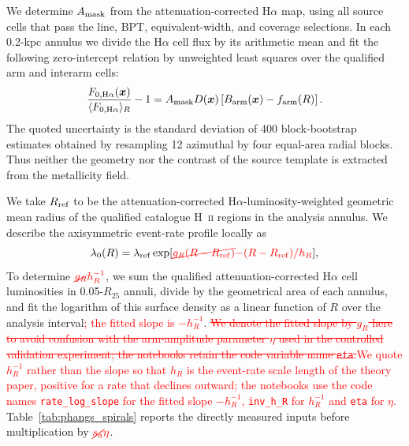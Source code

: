 \documentclass[fleqn,usenatbib]{mnras}
\newcommand{\bs}[1]{\boldsymbol{#1}}
\newcommand{\revadd}[1]{\textcolor{red}{#1}}
\newcommand{\revdel}[1]{\textcolor{red}{\sout{#1}}\hspace{0.18em}}
\newcommand{\revaddmath}[1]{\textcolor{red}{#1}}
\newcommand{\revdelmath}[1]{\textcolor{red}{\cancel{#1}}}
\begin{document}
We determine $A_{\rm mask}$ from the attenuation-corrected H$\alpha$ map, using all source cells that pass the line, BPT, equivalent-width, and coverage selections.  In each 0.2-kpc annulus we divide the H$\alpha$ cell flux by its arithmetic mean and fit the following zero-intercept relation by unweighted least squares over the qualified arm and interarm cells:
\begin{equation}
    \frac{F_{0,{\rm H}\alpha}(\bs{x})}
    {\langle F_{0,{\rm H}\alpha}\rangle_R}-1
    =A_{\rm mask}D(\bs{x})
    \left[B_{\rm arm}(\bs{x})-f_{\rm arm}(R)\right].
    \label{eq:phangs_mask_contrast}
\end{equation}
The quoted uncertainty is the standard deviation of 400 block-bootstrap estimates obtained by resampling 12 azimuthal by four equal-area radial blocks.  Thus neither the geometry nor the contrast of the source template is extracted from the metallicity field.

We take $R_{\rm ref}$ to be the attenuation-corrected H$\alpha$-luminosity-weighted geometric mean radius of the qualified catalogue H~\textsc{ii} regions in the analysis annulus.  We describe the axisymmetric event-rate profile locally as
\begin{equation}
    \lambda_0(R)=\lambda_{\rm ref}
    \exp[\revdelmath{g_R(R-R_{\rm ref})}\revaddmath{-(R-R_{\rm ref})/h_R}],
    \label{eq:phangs_radial_rate}
\end{equation}
To determine $\revdelmath{g_R}\revaddmath{h_R^{-1}}$, we sum the qualified attenuation-corrected H$\alpha$ cell luminosities in 0.05-$R_{25}$ annuli, divide by the geometrical area of each annulus, and fit the logarithm of this surface density as a linear function of $R$ over the analysis interval\revadd{; the fitted slope is $-h_R^{-1}$}.  \revdel{We denote the fitted slope by $g_R$ here to avoid confusion with the arm-amplitude parameter $\eta$ used in the controlled validation experiment; the notebooks retain the code variable name \texttt{eta}.}\revadd{We quote $h_R^{-1}$ rather than the slope so that $h_R$ is the event-rate scale length of the theory paper, positive for a rate that declines outward; the notebooks use the code names \texttt{rate\_log\_slope} for the fitted slope $-h_R^{-1}$, \texttt{inv\_h\_R} for $h_R^{-1}$ and \texttt{eta} for $\eta$.}  Table~\ref{tab:phangs_spirals} reports the directly measured inputs before multiplication by $\revdelmath{s_a}\revaddmath{\eta}$.
\end{document}
